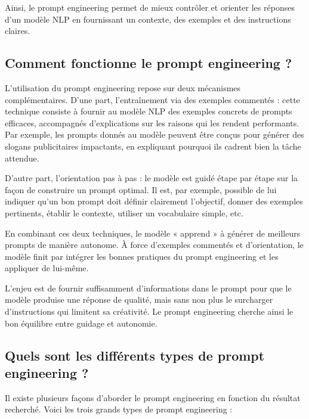 Ainsi, le prompt engineering permet de mieux contrôler et orienter les réponses d’un
modèle NLP en fournissant un contexte, des exemples et des instructions claires.

\subsection*{Comment fonctionne le prompt engineering ?}

L’utilisation du prompt engineering repose sur deux mécanismes complémentaires.
D’une part, l’entraînement via des exemples commentés : cette technique consiste
à fournir au modèle NLP des exemples concrets de prompts efficaces, accompagnés
d’explications sur les raisons qui les rendent performants. Par exemple, les
prompts donnés au modèle peuvent être conçus pour générer des slogans
publicitaires impactants, en expliquant pourquoi ils cadrent bien la tâche attendue.

D’autre part, l’orientation pas à pas : le modèle est guidé étape par étape sur
la façon de construire un prompt optimal. Il est, par exemple, possible de lui indiquer
qu’un bon prompt doit définir clairement l’objectif, donner des exemples
pertinents, établir le contexte, utiliser un vocabulaire simple, etc.

En combinant ces deux techniques, le modèle « apprend » à générer de meilleurs
prompts de manière autonome. À force d’exemples commentés et d’orientation, le
modèle finit par intégrer les bonnes pratiques du prompt engineering et les
appliquer de lui-même.

L’enjeu est de fournir suffisamment d’informations dans le prompt pour que le
modèle produise une réponse de qualité, mais sans non plus le surcharger d’instructions
qui limitent sa créativité. Le prompt engineering cherche ainsi le bon équilibre
entre guidage et autonomie.

\subsection*{Quels sont les différents types de prompt engineering ?}

Il existe plusieurs façons d’aborder le prompt engineering en fonction du résultat
recherché. Voici les trois grands types de prompt engineering :

